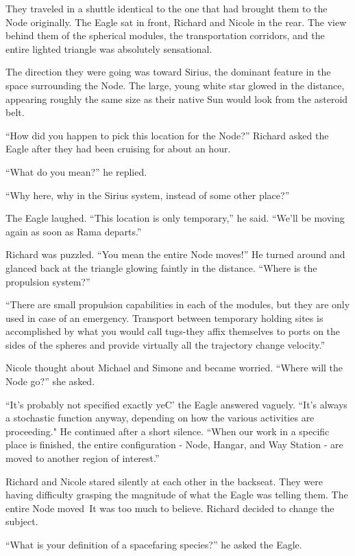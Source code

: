 \documentclass[]{article}
\begin{document}
{They traveled in a shuttle identical to the one that had brought them to the Node originally.  The Eagle sat in front, Richard and Nicole in the rear.  The view behind them of the spherical modules, the transportation corridors, and the entire lighted triangle was absolutely sensational.

The direction they were going was toward Sirius, the dominant feature in the space surrounding the Node.  The large, young white star glowed in the distance, appearing roughly the same size as their native Sun would look from the asteroid belt.

“How did you happen to pick this location for the Node?” Richard asked the Eagle after they had been cruising for about an hour.

“What do you mean?” he replied.

“Why here, why in the Sirius system, instead of some other place?”

The Eagle laughed.  “This location is only temporary,” he said.  “We’ll be moving again as soon as Rama departs.”

Richard was puzzled.  “You mean the entire Node moves!” He turned around and glanced back at the triangle glowing faintly in the distance.  “Where is the propulsion system?”

“There are small propulsion capabilities in each of the modules, but they are only used in case of an emergency.  Transport between temporary holding sites is accomplished by what you would call tugs-they affix themselves to ports on the sides of the spheres and provide virtually all the trajectory change velocity.”

Nicole thought about Michael and Simone and became worried.  “Where will the Node go?” she asked.

“It’s probably not specified exactly yeC’ the Eagle answered vaguely.  “It’s always a stochastic function anyway, depending on how the various activities are proceeding."  He continued after a short silence.  “When our work in a specific place is finished, the entire configuration - Node, Hangar, and Way Station - are moved to another region of interest.”

Richard and Nicole stared silently at each other in the backseat.  They were having difficulty grasping the magnitude of what the Eagle was telling them.  The entire Node moved\ It was too much to believe.  Richard decided to change the subject.

“What is your definition of a spacefaring species?” he asked the Eagle.

}
\end{document}

